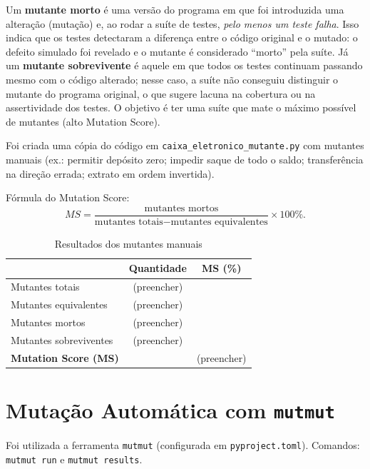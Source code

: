 \documentclass[11pt,a4paper]{article}
\begin{document}
Um \textbf{mutante morto} é uma versão do programa em que foi introduzida uma alteração (mutação) e, ao rodar a suíte de testes, \emph{pelo menos um teste falha}. Isso indica que os testes detectaram a diferença entre o código original e o mutado: o defeito simulado foi revelado e o mutante é considerado ``morto'' pela suíte. Já um \textbf{mutante sobrevivente} é aquele em que todos os testes continuam passando mesmo com o código alterado; nesse caso, a suíte não conseguiu distinguir o mutante do programa original, o que sugere lacuna na cobertura ou na assertividade dos testes. O objetivo é ter uma suíte que mate o máximo possível de mutantes (alto Mutation Score).

Foi criada uma cópia do código em \texttt{caixa\_eletronico\_mutante.py}
com mutantes manuais (ex.: permitir depósito zero; impedir saque de todo o saldo;
transferência na direção errada; extrato em ordem invertida).

Fórmula do Mutation Score:
\[
MS = \frac{\text{mutantes mortos}}{\text{mutantes totais} - \text{mutantes equivalentes}} \times 100\%.
\]

\begin{table}[H]
  \centering
  \caption{Resultados dos mutantes manuais}
  \label{tab:mutantes-manuais}
  \begin{tabular}{lcc}
    \toprule
    & Quantidade & MS (\%) \\
    \midrule
    Mutantes totais                & (preencher) & \\
    Mutantes equivalentes           & (preencher) & \\
    Mutantes mortos                 & (preencher) & \\
    Mutantes sobreviventes          & (preencher) & \\
    \midrule
    \textbf{Mutation Score (MS)}    & & (preencher) \\
    \bottomrule
  \end{tabular}
\end{table}

\section{Mutação Automática com \texttt{mutmut}}

Foi utilizada a ferramenta \texttt{mutmut} (configurada em \texttt{pyproject.toml}).
Comandos: \texttt{mutmut run} e \texttt{mutmut results}.
\end{document}
